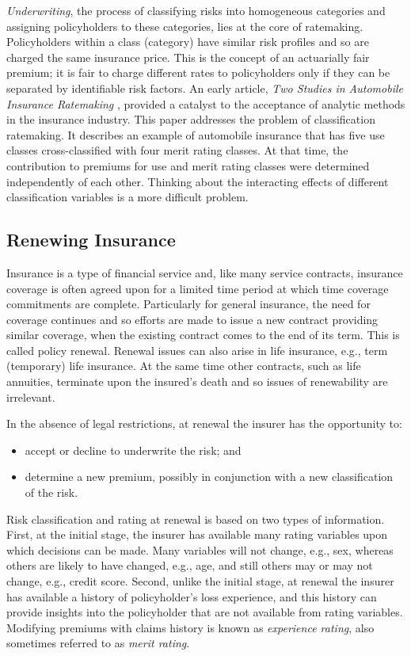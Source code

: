 \documentclass[]{book}
\theoremstyle{definition}
\theoremstyle{definition}
\theoremstyle{definition}
\theoremstyle{remark}
\begin{document}
\emph{Underwriting}, the process of classifying risks into homogeneous
categories and assigning policyholders to these categories, lies at the
core of ratemaking. Policyholders within a class (category) have similar
risk profiles and so are charged the same insurance price. This is the
concept of an actuarially fair premium; it is fair to charge different
rates to policyholders only if they can be separated by identifiable
risk factors. An early article, \emph{Two Studies in Automobile
Insurance Ratemaking} \citep{bailey1960}, provided a catalyst to the
acceptance of analytic methods in the insurance industry. This paper
addresses the problem of classification ratemaking. It describes an
example of automobile insurance that has five use classes
cross-classified with four merit rating classes. At that time, the
contribution to premiums for use and merit rating classes were
determined independently of each other. Thinking about the interacting
effects of different classification variables is a more difficult
problem.

\subsection{Renewing Insurance}\label{renewing-insurance}

Insurance is a type of financial service and, like many service
contracts, insurance coverage is often agreed upon for a limited time
period at which time coverage commitments are complete. Particularly for
general insurance, the need for coverage continues and so efforts are
made to issue a new contract providing similar coverage, when the
existing contract comes to the end of its term. This is called policy
renewal. Renewal issues can also arise in life insurance, e.g., term
(temporary) life insurance. At the same time other contracts, such as
life annuities, terminate upon the insured's death and so issues of
renewability are irrelevant.

In the absence of legal restrictions, at renewal the insurer has the
opportunity to:

\begin{itemize}
\item
  accept or decline to underwrite the risk; and
\item
  determine a new premium, possibly in conjunction with a new
  classification of the risk.
\end{itemize}

Risk classification and rating at renewal is based on two types of
information. First, at the initial stage, the insurer has available many
rating variables upon which decisions can be made. Many variables will
not change, e.g., sex, whereas others are likely to have changed, e.g.,
age, and still others may or may not change, e.g., credit score. Second,
unlike the initial stage, at renewal the insurer has available a history
of policyholder's loss experience, and this history can provide insights
into the policyholder that are not available from rating variables.
Modifying premiums with claims history is known as \emph{experience
rating}, also sometimes referred to as \emph{merit rating}.
\end{document}
